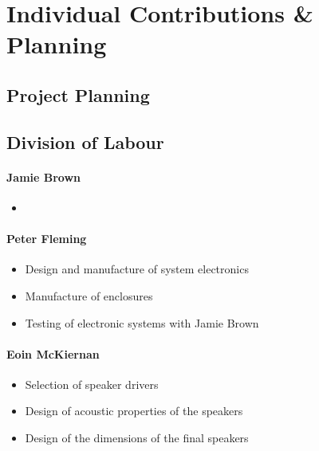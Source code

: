 \documentclass[main.tex]{subfiles}
\begin{document}
\chapter{Individual Contributions \& Planning}
\section{Project Planning}
\section{Division of Labour}

\subsubsection{Jamie Brown}
\begin{itemize}
    \item 
\end{itemize}

\subsubsection{Peter Fleming}
\begin{itemize}
    \item Design and manufacture of system electronics
    \item Manufacture of enclosures
    \item Testing of electronic systems with Jamie Brown
\end{itemize}

\subsubsection{Eoin McKiernan}
\begin{itemize}
    \item Selection of speaker drivers
    \item Design of acoustic properties of the speakers
    \item Design of the dimensions of the final speakers
\end{itemize}
\end{document}
